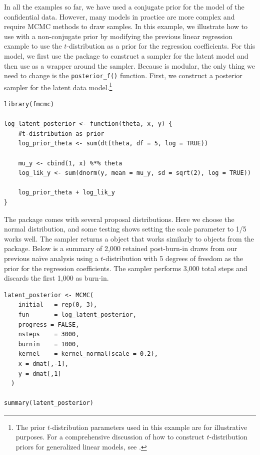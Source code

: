 In all the examples so far, we have used a conjugate prior for the model
of the confidential data. However, many models in practice are more complex and
require MCMC methods to draw samples. In this example, we illustrate how
to use  with a non-conjugate prior by
modifying the previous linear regression example to use the \(t\)-distribution
as a prior for the regression coefficients. For this model, we first use the 
package to construct a sampler for the latent model and then use  as a
wrapper around the  sampler. Because  is
modular, the only thing we need to change is the \texttt{posterior\_f()} function. First,
we construct a posterior sampler for the latent data model.\footnote{The prior
  \(t\)-distribution parameters used in this example are for
  illustrative purposes. For a comprehensive discussion of how to
  construct \(t\)-distribution priors for generalized linear models, see
  \citep{Gelman2008}.}

\begin{verbatim}
library(fmcmc)

log_latent_posterior <- function(theta, x, y) {
    #t-distribution as prior
    log_prior_theta <- sum(dt(theta, df = 5, log = TRUE))
    
    mu_y <- cbind(1, x) %*% theta
    log_lik_y <- sum(dnorm(y, mean = mu_y, sd = sqrt(2), log = TRUE))
    
    log_prior_theta + log_lik_y
}
\end{verbatim}

The  package comes with several proposal distributions. Here
we choose the normal distribution, and some testing shows setting
the scale parameter to 1/5 works well. The sampler returns a  \citep{coda_pkg}
object that works similarly to objects from the  package.
Below is a summary of 2,000 retained post-burn-in draws from our
previous naïve analysis using a \(t\)-distribution with 5 degrees of freedom as
the prior for the regression coefficients. The sampler performs 3,000 total
steps and discards the first 1,000 as burn-in.

\begin{verbatim}
latent_posterior <- MCMC(
    initial   = rep(0, 3), 
    fun       = log_latent_posterior, 
    progress = FALSE,
    nsteps    = 3000, 
    burnin    = 1000,
    kernel    = kernel_normal(scale = 0.2),
    x = dmat[,-1],
    y = dmat[,1] 
  )

summary(latent_posterior)
\end{verbatim}

